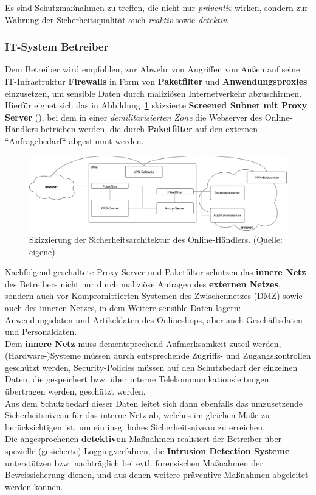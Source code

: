 Es sind Schutzmaßnahmen zu treffen, die nicht nur \textit{präventiv} wirken, sondern zur Wahrung der Sicherheitsqualität auch \textit{reaktiv} sowie \textit{detektiv}.

\subsubsection*{IT-System Betreiber}

Dem Betreiber wird empfohlen, zur Abwehr von Angriffen von Außen auf seine IT-Infrastruktur \textbf{Firewalls} in Form von \textbf{Paketfilter} und \textbf{Anwendungsproxies} einzusetzen, um sensible Daten durch maliziösen Internetverkehr abzuschirmen.\\
Hierfür eignet sich das in Abbildung~\ref{fig:screened_subnet} skizzierte \textbf{Screened Subnet mit Proxy Server} (\cite[89 f.]{ITS4}), bei dem in einer \textit{demilitarisierten Zone} die Webserver  des Online-Händlers betrieben werden, die durch \textbf{Paketfilter} auf den externen ``Anfragebedarf`` abgestimmt werden.\\

\begin{figure}
    \centering
    \includegraphics[scale=0.25]{aufgabe 2/img/screened_subnet.svg}
    \caption{Skizzierung der Sicherheitsarchitektur des Online-Händlers. (Quelle: eigene)}
    \label{fig:screened_subnet}
\end{figure}

\noindent
Nachfolgend geschaltete Proxy-Server und Paketfilter schützen das \textbf{innere Netz} des Betreibers nicht nur durch maliziöse Anfragen des \textbf{externen Netzes}, sondern auch vor Kompromittierten Systemen des Zwischennetzes (DMZ) sowie auch des inneren Netzes, in dem Weitere sensible Daten lagern: Anwendungsdaten und Artikeldaten des Onlineshops, aber auch Geschäftsdaten und Personaldaten.\\
Dem \textbf{innere Netz} muss dementsprechend Aufmerksamkeit zuteil werden, (Hardware-)Systeme müssen durch entsprechende Zugriffs- und Zugangskontrollen geschützt werden, Security-Policies müssen auf den Schutzbedarf der einzelnen Daten, die gespeichert bzw. über interne Telekommunikationsleitungen übertragen werden, geschützt werden.\\
Aus dem Schutzbedarf dieser Daten leitet sich dann ebenfalls das umzusetzende Sicherheitsniveau für das interne Netz ab, welches im gleichen Maße zu berücksichtigen ist, um ein insg. hohes Sicherheitsniveau zu erreichen.\\
Die angesprochenen \textbf{detektiven} Maßnahmen realisiert der Betreiber über spezielle (gesicherte) Loggingverfahren, die  \textbf{Intrusion Detection Systeme} unterstützen bzw. nachträglich bei evtl. forensischen Maßnahmen der Beweissicherung dienen, und aus denen weitere präventive Maßnahmen abgeleitet werden können.

